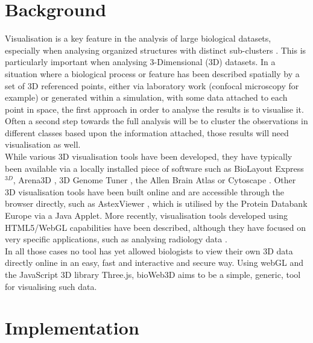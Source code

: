 \documentclass[10pt]{bmc_article}
\newenvironment{bmcformat}{\baselineskip20pt\sloppy\setboolean{publ}{false}}{\baselineskip20pt\sloppy}
\begin{document}
\begin{bmcformat}
\section{Background}

Visualisation is a key feature in the analysis of large biological datasets, especially when analysing organized structures with distinct sub-clusters \cite{Rubel10}. This is particularly important when analysing 3-Dimensional (3D) datasets. In a situation where a biological process or feature has been described spatially by a set of 3D referenced points, either via laboratory work (confocal microscopy for example) or generated within a simulation, with some data attached to each point in space, the first approach in order to analyse the results is to visualise it. Often a second step towards the full analysis will be to cluster the observations in different classes based upon the information attached, those results will need visualisation as well. \\
While various 3D visualisation tools have been developed, they have typically been available via a locally installed piece of software such as BioLayout Express$^{3D}$\cite{Freeman07}, Arena3D \cite{Pavlopoulos08},  3D Genome Tuner \cite{Wang09}, the Allen Brain Atlas \cite{Lein07} or Cytoscape \cite{Shannon03}. Other 3D visualisation tools have been built online and are accessible through the browser directly, such as AstexViewer \cite{Hartshorn02}, which is utilised by the Protein Databank Europe via a Java Applet. More recently, visualisation tools developed using HTML5/WebGL capabilities have been described, although they have focused on very specific applications, such as analysing radiology data  \cite{Dinesh12}.\\
In all those cases no tool has yet allowed biologists to view their own 3D data directly online in an easy, fast and interactive and secure way. Using webGL and the JavaScript 3D library Three.js, bioWeb3D aims to be a simple, generic, tool for visualising such data.\\






\section{Implementation}


\end{bmcformat}
\end{document}
